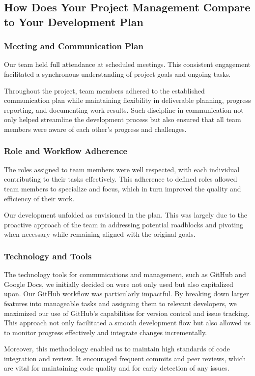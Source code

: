 \documentclass{article}
\begin{document}
\subsection{How Does Your Project Management Compare to Your Development Plan}
\subsubsection{Meeting and Communication Plan}
Our team held full attendance at scheduled meetings. This consistent engagement facilitated a synchronous understanding of project goals and ongoing tasks.

Throughout the project, team members adhered to the established communication plan while maintaining flexibility in deliverable planning, progress reporting, and documenting work results.
Such discipline in communication not only helped streamline the development process but also ensured that all team members were aware of each other's progress and challenges. 
\subsubsection{Role and Workflow Adherence}
The roles assigned to team members were well respected, with each individual contributing to their tasks effectively. This adherence to defined roles allowed team members to specialize and focus, which in turn improved the quality and efficiency of their work.

Our development unfolded as envisioned in the plan. This was largely due to the proactive approach of the team in addressing potential roadblocks and pivoting when necessary while remaining aligned with the original goals.
\subsubsection{Technology and Tools}
The technology tools for communications and management, such as GitHub and Google Docs, we initially decided on were not only used but also capitalized upon. Our GitHub workflow was particularly impactful. By breaking down larger features into manageable tasks and assigning them to relevant developers, we maximized our use of GitHub's capabilities for version control and issue tracking. This approach not only facilitated a smooth development flow but also allowed us to monitor progress effectively and integrate changes incrementally.

Moreover, this methodology enabled us to maintain high standards of code integration and review. It encouraged frequent commits and peer reviews, which are vital for maintaining code quality and for early detection of any issues.
\end{document}
